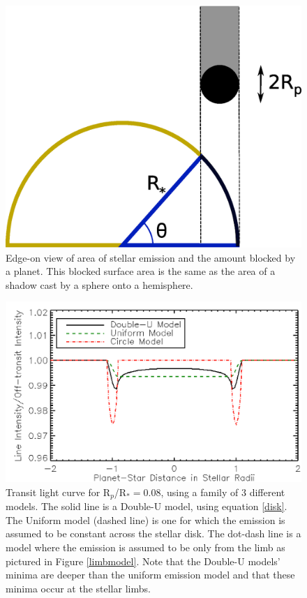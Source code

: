 \documentclass[twocolumn]{emulateapj}
\newcommand{\p}{R$_p$/R$_*$}
\begin{document}

\begin{figure}
\includegraphics[width=0.5 \textwidth]{chrom_shadow2.eps}
\caption{Edge-on view of area of stellar emission and the amount blocked by  a planet. This blocked surface area is the same as the area of a shadow cast by a sphere onto a hemisphere.}
\label{fig01}
\end{figure}

\begin{figure}
\includegraphics[width=0.5 \textwidth]{model_compare2.eps}
\caption{Transit light curve for \p $=0.08$, using a family of 3 different models. The solid line is a Double-U model, using equation \ref{disk}. The Uniform model (dashed line) is one for which the emission is assumed to be constant across the stellar disk. The dot-dash line is a model where the emission is assumed to be only from the limb as pictured in Figure \ref{limbmodel}. Note that the Double-U models' minima are deeper than the uniform emission model and that these minima occur at the stellar limbs. }
\label{fig02}
\end{figure}
\end{document}

